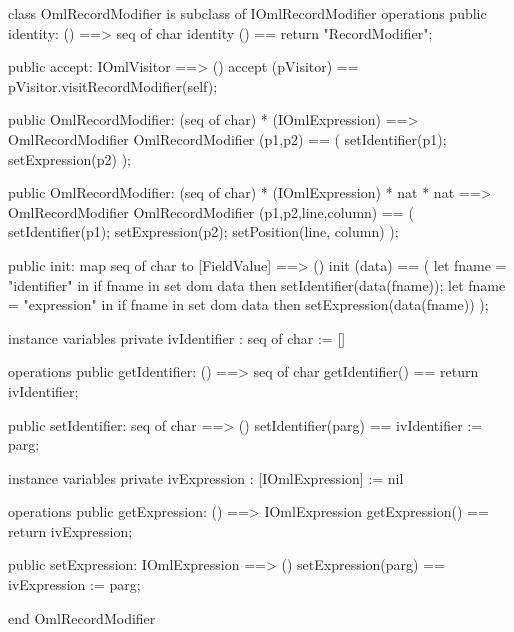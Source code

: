 \begin{vdm_al}
class OmlRecordModifier is subclass of IOmlRecordModifier
operations
  public identity: () ==> seq of char
  identity () == return "RecordModifier";

  public accept: IOmlVisitor ==> ()
  accept (pVisitor) == pVisitor.visitRecordModifier(self);

  public OmlRecordModifier:
    (seq of char) *
    (IOmlExpression) ==> OmlRecordModifier
  OmlRecordModifier (p1,p2) == 
    ( setIdentifier(p1);
      setExpression(p2) );

  public OmlRecordModifier:
    (seq of char) *
    (IOmlExpression) *
    nat *
    nat ==> OmlRecordModifier
  OmlRecordModifier (p1,p2,line,column) == 
    ( setIdentifier(p1);
      setExpression(p2);
      setPosition(line, column) );

  public init: map seq of char to [FieldValue] ==> ()
  init (data) ==
    ( let fname = "identifier" in
        if fname in set dom data
        then setIdentifier(data(fname));
      let fname = "expression" in
        if fname in set dom data
        then setExpression(data(fname)) );

instance variables
  private ivIdentifier : seq of char := []

operations
  public getIdentifier: () ==> seq of char
  getIdentifier() == return ivIdentifier;

  public setIdentifier: seq of char ==> ()
  setIdentifier(parg) == ivIdentifier := parg;

instance variables
  private ivExpression : [IOmlExpression] := nil

operations
  public getExpression: () ==> IOmlExpression
  getExpression() == return ivExpression;

  public setExpression: IOmlExpression ==> ()
  setExpression(parg) == ivExpression := parg;

end OmlRecordModifier
\end{vdm_al}

